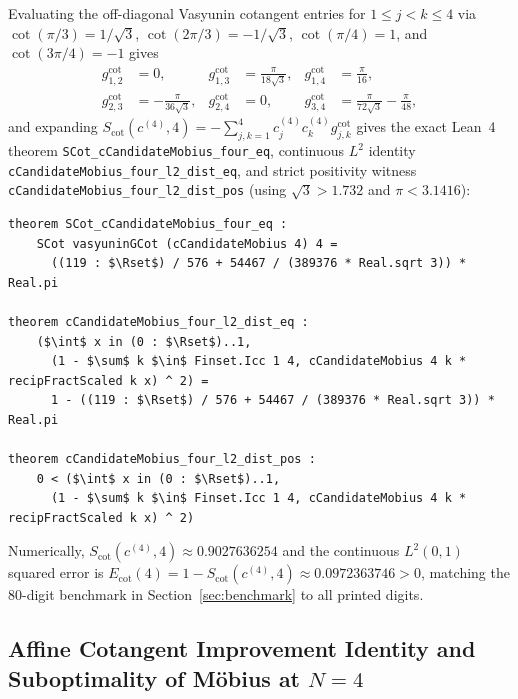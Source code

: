 \documentclass[11pt,a4paper]{article}
\theoremstyle{definition}
\newcommand{\Rset}{\mathbb{R}}
\begin{document}
Evaluating the off-diagonal Vasyunin cotangent entries for $1 \le j < k \le 4$ via $\cot(\pi/3) = 1/\sqrt{3}$, $\cot(2\pi/3) = -1/\sqrt{3}$, $\cot(\pi/4) = 1$, and $\cot(3\pi/4) = -1$ gives
\begin{align}
g_{1,2}^{\mathrm{cot}} &= 0, &
g_{1,3}^{\mathrm{cot}} &= \frac{\pi}{18\sqrt{3}}, &
g_{1,4}^{\mathrm{cot}} &= \frac{\pi}{16}, \\
g_{2,3}^{\mathrm{cot}} &= -\frac{\pi}{36\sqrt{3}}, &
g_{2,4}^{\mathrm{cot}} &= 0, &
g_{3,4}^{\mathrm{cot}} &= \frac{\pi}{72\sqrt{3}} - \frac{\pi}{48},
\end{align}
and expanding $S_{\mathrm{cot}}(c^{(4)}, 4) = -\sum_{j,k=1}^4 c_j^{(4)} c_k^{(4)} g_{j,k}^{\mathrm{cot}}$ gives the exact Lean~4 theorem \texttt{SCot\_\allowbreak cCandidateMobius\_\allowbreak four\_\allowbreak eq}, continuous $L^2$ identity \texttt{cCandidateMobius\_\allowbreak four\_\allowbreak l2\_\allowbreak dist\_\allowbreak eq}, and strict positivity witness \texttt{cCandidateMobius\_\allowbreak four\_\allowbreak l2\_\allowbreak dist\_\allowbreak pos} (using $\sqrt{3} > 1.732$ and $\pi < 3.1416$):
\begin{lstlisting}
theorem SCot_cCandidateMobius_four_eq :
    SCot vasyuninGCot (cCandidateMobius 4) 4 =
      ((119 : $\Rset$) / 576 + 54467 / (389376 * Real.sqrt 3)) * Real.pi

theorem cCandidateMobius_four_l2_dist_eq :
    ($\int$ x in (0 : $\Rset$)..1,
      (1 - $\sum$ k $\in$ Finset.Icc 1 4, cCandidateMobius 4 k * recipFractScaled k x) ^ 2) =
      1 - ((119 : $\Rset$) / 576 + 54467 / (389376 * Real.sqrt 3)) * Real.pi

theorem cCandidateMobius_four_l2_dist_pos :
    0 < ($\int$ x in (0 : $\Rset$)..1,
      (1 - $\sum$ k $\in$ Finset.Icc 1 4, cCandidateMobius 4 k * recipFractScaled k x) ^ 2)
\end{lstlisting}
Numerically, $S_{\mathrm{cot}}(c^{(4)}, 4) \approx 0.9027636254$ and the continuous $L^2(0, 1)$ squared error is $E_{\mathrm{cot}}(4) = 1 - S_{\mathrm{cot}}(c^{(4)}, 4) \approx 0.0972363746 > 0$, matching the $80$-digit benchmark in Section~\ref{sec:benchmark} to all printed digits.

\subsection{Affine Cotangent Improvement Identity and Suboptimality of M\"obius at \texorpdfstring{$N = 4$}{N = 4}}
\end{document}
